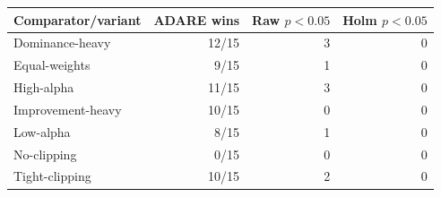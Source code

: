 \begin{tabular}{lrrr}
\toprule
Comparator/variant & ADARE wins & Raw $p<0.05$ & Holm $p<0.05$ \\
\midrule
Dominance-heavy & 12/15 & 3 & 0 \\
Equal-weights & 9/15 & 1 & 0 \\
High-alpha & 11/15 & 3 & 0 \\
Improvement-heavy & 10/15 & 0 & 0 \\
Low-alpha & 8/15 & 1 & 0 \\
No-clipping & 0/15 & 0 & 0 \\
Tight-clipping & 10/15 & 2 & 0 \\
\bottomrule
\end{tabular}
